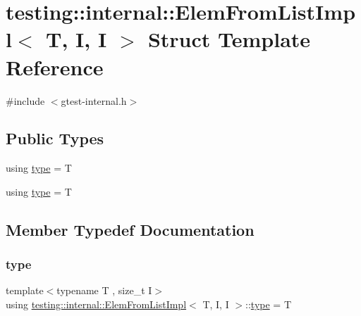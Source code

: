 \hypertarget{structtesting_1_1internal_1_1_elem_from_list_impl_3_01_t_00_01_i_00_01_i_01_4}{}\section{testing\+::internal\+::Elem\+From\+List\+Impl$<$ T, I, I $>$ Struct Template Reference}
\label{structtesting_1_1internal_1_1_elem_from_list_impl_3_01_t_00_01_i_00_01_i_01_4}


{\ttfamily \#include $<$gtest-\/internal.\+h$>$}

\subsection*{Public Types}
\begin{DoxyCompactItemize}
\item 
using \mbox{\hyperlink{structtesting_1_1internal_1_1_elem_from_list_impl_3_01_t_00_01_i_00_01_i_01_4_ab1552e339cc1ff1e0aa448d684ffaf39}{type}} = T
\item 
using \mbox{\hyperlink{structtesting_1_1internal_1_1_elem_from_list_impl_3_01_t_00_01_i_00_01_i_01_4_ab1552e339cc1ff1e0aa448d684ffaf39}{type}} = T
\end{DoxyCompactItemize}


\subsection{Member Typedef Documentation}
\mbox{\label{structtesting_1_1internal_1_1_elem_from_list_impl_3_01_t_00_01_i_00_01_i_01_4_ab1552e339cc1ff1e0aa448d684ffaf39}} 
\subsubsection{\texorpdfstring{type}{type}\hspace{0.1cm}{\footnotesize\ttfamily [1/2]}}
{\footnotesize\ttfamily template$<$typename T , size\+\_\+t I$>$ \\
using \mbox{\hyperlink{structtesting_1_1internal_1_1_elem_from_list_impl}{testing\+::internal\+::\+Elem\+From\+List\+Impl}}$<$ T, I, I $>$\+::\mbox{\hyperlink{structtesting_1_1internal_1_1_elem_from_list_impl_3_01_t_00_01_i_00_01_i_01_4_ab1552e339cc1ff1e0aa448d684ffaf39}{type}} =  T}


